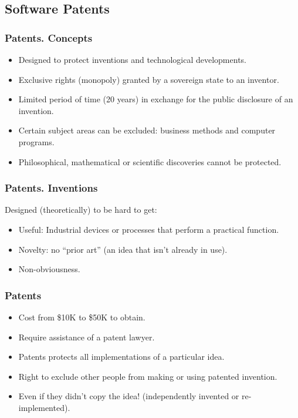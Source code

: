 \documentclass{beamer}
\begin{document}
\subsection{Software Patents}
\begin{frame}
\frametitle{Patents. Concepts}

\begin{itemize}
\item Designed to protect \alert{inventions} and \alert{technological developments}. 
\item \alert{Exclusive rights} (monopoly) granted by a sovereign state to an inventor.
\item Limited period of time (20 years) in exchange for the \alert{public disclosure} of an \alert{invention}.
\item Certain subject areas can be excluded: business methods and computer programs.
\item Philosophical, mathematical or scientific discoveries cannot be protected.
\end{itemize}                                                 

\end{frame}

\begin{frame}
\frametitle{Patents. Inventions}

Designed (theoretically) to be hard to get:

\begin{itemize}
\item \alert{Useful}: Industrial devices or processes that perform a practical function.
\item \alert{Novelty}: no ``prior art'' (an idea that isn't already in use).
\item \alert{Non-obviousness}.
\end{itemize}                                                 

\end{frame}

\begin{frame}
\frametitle{Patents}

\begin{itemize}
\item Cost from \$10K to \$50K to obtain.
\item Require assistance of a patent lawyer.
\item Patents protects \alert{all} implementations of a particular idea.
\item \alert{Right to exclude} other people from making or using patented invention.
\item Even if they didn't copy the idea! (independently invented or re-implemented).
\end{itemize}                                                 

\end{frame}
\end{document}

